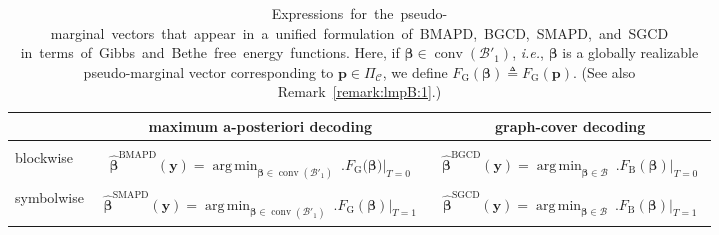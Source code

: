 \documentclass[journal, twocolumn]{IEEEtran}
\renewcommand{\mathbf}[1]{{\bm{#1}}}
\newcommand{\ie}{\emph{i.e.}}
\newcommand{\vect}[1]{\mathbf{#1}}
\newcommand{\code}[1]{\mathcal{#1}}
\DeclareMathOperator*{\argmin}{arg\,min}
\newcommand{\defeq}{\triangleq}
\newcommand{\codeC}{\code{C}}
\newcommand{\bel}{\beta}
\newcommand{\vbel}{\boldsymbol{\bel}}
\newcommand{\hvbel}{\boldsymbol{\hat \bel}}
\newcommand{\BGCD}{\mathrm{BGCD}}
\newcommand{\SGCD}{\mathrm{SGCD}}
\newcommand{\vp}{\vect{p}}
\newcommand{\BMAPD}{\mathrm{BMAPD}}
\newcommand{\SMAPD}{\mathrm{SMAPD}}
\newcommand{\vy}{\vect{y}}
\newcommand{\lmpB}{\mathcal{B}}
\newcommand{\lmpBdown}[1]{\mathcal{B}'_{#1}}
\newcommand{\convhull}{\operatorname{conv}}
\newcommand{\FBethe}{F_{\mathrm{B}}}
\newcommand{\?}{\mathrm{?}}
\newcommand{\FGibbs}{F_{\mathrm{G}}}
\newcommand{\setPi}{\Pi}
\begin{document}
\begin{table}
  \caption{
    \mbox{Expressions for the pseudo-marginal vectors that appear in a
      unified formulation of BMAPD, BGCD, SMAPD, and SGCD}
    \mbox{in terms of Gibbs and Bethe free energy functions.}
    Here, if $\vbel \in \convhull(\lmpBdown{1})$, \ie, 
    $\vbel$ is a globally realizable pseudo-marginal vector corresponding to 
    $\vp \in \setPi_{\codeC}$, we define $\FGibbs(\vbel) \defeq \FGibbs(\vp)$.
    (See also Remark~\ref{remark:lmpB:1}.)}
  \begin{center}
    \begin{tabular}{|l|c|c|}
      \hline
      &
      maximum a-posteriori decoding
      &
      graph-cover decoding \\
      \hline
      \hline
      & & \\[-0.25cm]
      blockwise
      &
      \begin{minipage}{0.43\linewidth}
        \begin{align*}
          \hvbel^{\BMAPD}(\vy)
             = \argmin_{\vbel \in \convhull(\lmpBdown{1})} \ 
                 \Big.
                   \FGibbs\big( \vbel \big)
                 \Big|_{T = 0}
        \end{align*}
      \end{minipage} &
      \begin{minipage}{0.42\linewidth}
        \begin{align*}
          \hvbel^{\BGCD}(\vy)
             = \argmin_{\vbel \in \lmpB} \ 
                 \Big.
                   \FBethe(\vbel)
                 \Big|_{T = 0}
        \end{align*}
      \end{minipage} \\[0.5cm]
      \hline
      symbolwise
      &
      \begin{minipage}{0.43\linewidth}
        \begin{align*}
          \hvbel^{\SMAPD}(\vy)
             = \argmin_{\vbel \in \convhull(\lmpBdown{1})} \ 
                 \Big.
                   \FGibbs(\vbel)
                 \Big|_{T = 1}
        \end{align*}
      \end{minipage} &
      \begin{minipage}{0.42\linewidth}
        \begin{align*}
          \hvbel^{\SGCD}(\vy)
             = \argmin_{\vbel \in \lmpB} \ 
                 \Big.
                   \FBethe(\vbel)
                 \Big|_{T = 1}
        \end{align*}
      \end{minipage} \\[0.5cm]
      \hline
    \end{tabular}
  \end{center}
  \label{table:decoder:comparision:2}
\end{table}
\end{document}
